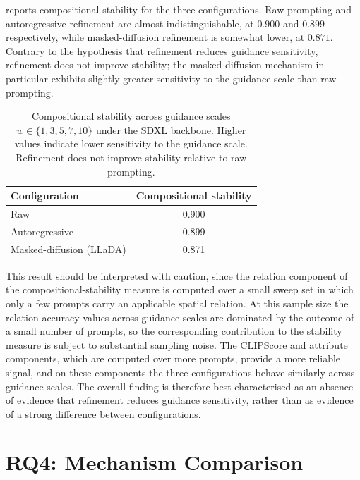 \documentclass[a4paper,twoside,12pt]{report}
\begin{document}
 reports compositional stability for the three
configurations. Raw prompting and autoregressive refinement are almost
indistinguishable, at \(0.900\) and \(0.899\) respectively, while
masked-diffusion refinement is somewhat lower, at \(0.871\). Contrary to the
hypothesis that refinement reduces guidance sensitivity, refinement does not
improve stability; the masked-diffusion mechanism in particular exhibits
slightly greater sensitivity to the guidance scale than raw prompting.

\begin{table}[H]
\centering
\begin{tabular}{lc}
\toprule
\textbf{Configuration} & \textbf{Compositional stability} \\
\midrule
Raw                      & 0.900 \\
Autoregressive           & 0.899 \\
Masked-diffusion (LLaDA) & 0.871 \\
\bottomrule
\end{tabular}
\caption[Compositional stability under SDXL]{Compositional stability across
guidance scales \(w \in \{1,3,5,7,10\}\) under the SDXL backbone. Higher values
indicate lower sensitivity to the guidance scale. Refinement does not improve
stability relative to raw prompting.}
\label{tab:rq3_stability}
\end{table}

This result should be interpreted with caution, since the relation component of
the compositional-stability measure is computed over a small sweep set in which
only a few prompts carry an applicable spatial relation. At this sample size the
relation-accuracy values across guidance scales are dominated by the outcome of
a small number of prompts, so the corresponding contribution to the stability
measure is subject to substantial sampling noise. The CLIPScore and attribute
components, which are computed over more prompts, provide a more reliable
signal, and on these components the three configurations behave similarly across
guidance scales. The overall finding is therefore best characterised as an
absence of evidence that refinement reduces guidance sensitivity, rather than as
evidence of a strong difference between configurations.

\section{RQ4: Mechanism Comparison}
\label{sec:rq4}
\end{document}
